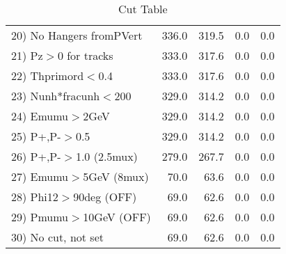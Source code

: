 \begin{table}[h!]
\begin{tabular}{||l||r|r|r|r||}
 20) No Hangers fromPVert &       336.0 &       319.5 &         0.0 &         0.0 \\
 21) Pz$>$0 for tracks    &       333.0 &       317.6 &         0.0 &         0.0 \\
 22) Thprimord$<$0.4      &       333.0 &       317.6 &         0.0 &         0.0 \\
 23) Nunh*fracunh$<$200   &       329.0 &       314.2 &         0.0 &         0.0 \\
 24) Emumu$>$2GeV         &       329.0 &       314.2 &         0.0 &         0.0 \\
 25) P+,P-$>$0.5          &       329.0 &       314.2 &         0.0 &         0.0 \\
 26) P+,P-$>$1.0 (2.5mux) &       279.0 &       267.7 &         0.0 &         0.0 \\
 27) Emumu$>$5GeV  (8mux) &        70.0 &        63.6 &         0.0 &         0.0 \\
 28) Phi12$>$90deg  (OFF) &        69.0 &        62.6 &         0.0 &         0.0 \\
 29) Pmumu$>$10GeV  (OFF) &        69.0 &        62.6 &         0.0 &         0.0 \\
 30) No cut, not set      &        69.0 &        62.6 &         0.0 &         0.0 \\
 \hline
 \hline
 \end{tabular}
 \caption{Cut Table \cohjp  }
 \label{tab-cut__jpsi}
 \end{table}
